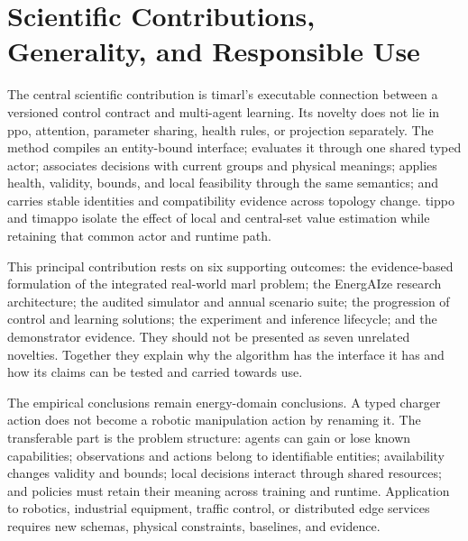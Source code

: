
\section{Scientific Contributions, Generality, and Responsible Use}
\label{sec:discussion-contributions}

The central scientific contribution is \gls{timarl}'s executable connection between a versioned control contract and multi-agent learning. Its novelty does not lie in \gls{ppo}, attention, parameter sharing, health rules, or projection separately. The method compiles an entity-bound interface; evaluates it through one shared typed actor; associates decisions with current groups and physical meanings; applies health, validity, bounds, and local feasibility through the same semantics; and carries stable identities and compatibility evidence across topology change. \gls{tippo} and \gls{timappo} isolate the effect of local and central-set value estimation while retaining that common actor and runtime path.

This principal contribution rests on six supporting outcomes: the evidence-based formulation of the integrated real-world \gls{marl} problem; the EnergAIze research architecture; the audited simulator and annual scenario suite; the progression of control and learning solutions; the experiment and inference lifecycle; and the demonstrator evidence. They should not be presented as seven unrelated novelties. Together they explain why the algorithm has the interface it has and how its claims can be tested and carried towards use.

The empirical conclusions remain energy-domain conclusions. A typed charger action does not become a robotic manipulation action by renaming it. The transferable part is the problem structure: agents can gain or lose known capabilities; observations and actions belong to identifiable entities; availability changes validity and bounds; local decisions interact through shared resources; and policies must retain their meaning across training and runtime. Application to robotics, industrial equipment, traffic control, or distributed edge services requires new schemas, physical constraints, baselines, and evidence.

